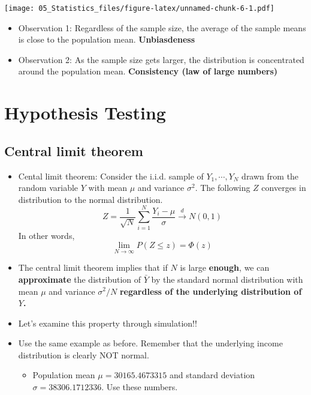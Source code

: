 \documentclass[]{book}
\providecommand{\tightlist}{%
  \setlength{\itemsep}{0pt}\setlength{\parskip}{0pt}}
\begin{document}
\texttt{[image: 05\_Statistics\_files/figure-latex/unnamed-chunk-6-1.pdf]}

\begin{itemize}
\tightlist
\item
  Observation 1: Regardless of the sample size, the average of the
  sample means is close to the population mean. \textbf{Unbiasdeness}
\item
  Observation 2: As the sample size gets larger, the distribution is
  concentrated around the population mean. \textbf{Consistency (law of
  large numbers)}
\end{itemize}

\section{Hypothesis Testing}\label{hypothesis-testing}

\subsection{Central limit theorem}\label{central-limit-theorem}

\begin{itemize}
\item
  Cental limit theorem: Consider the i.i.d. sample of
  \(Y_1,\cdots, Y_N\) drawn from the random variable \(Y\) with mean
  \(\mu\) and variance \(\sigma^2\). The following \(Z\) converges in
  distribution to the normal distribution. \[
  Z = \frac{1}{\sqrt{N}} \sum_{i=1}^N \frac{Y_i - \mu}{\sigma } \overset{d}{\rightarrow}N(0,1)
  \] In other words, \[
  \lim_{N\rightarrow\infty}P\left(Z \leq z\right)=\Phi(z)
  \]
\item
  The central limit theorem implies that if \(N\) is large
  \textbf{enough}, we can \textbf{approximate} the distribution of
  \(\bar{Y}\) by the standard normal distribution with mean \(\mu\) and
  variance \(\sigma^2 / N\) \textbf{regardless of the underlying
  distribution of \(Y\).}
\item
  Let's examine this property through simulation!!
\item
  Use the same example as before. Remember that the underlying income
  distribution is clearly NOT normal.

  \begin{itemize}
  \tightlist
  \item
    Population mean \(\mu = 30165.4673315\) and standard deviation
    \(\sigma = 38306.1712336\). Use these numbers.
  \end{itemize}
\end{itemize}
\end{document}

